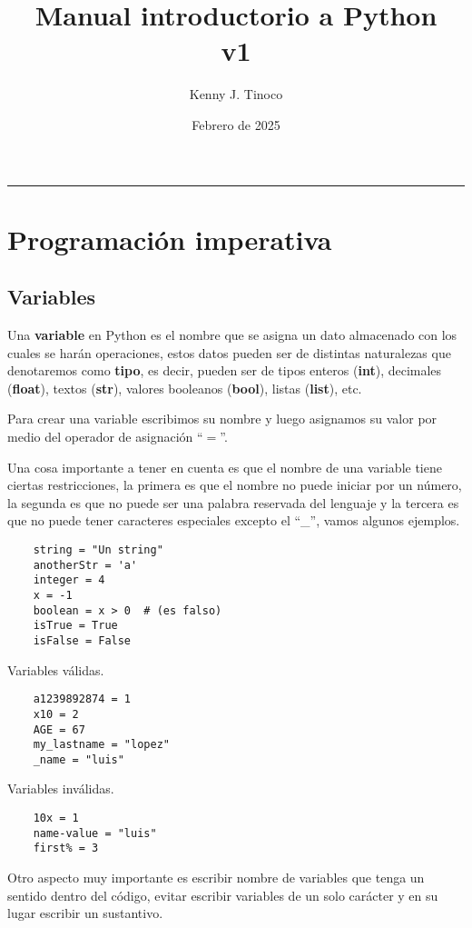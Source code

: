 \documentclass[12pt]{article}
\title{Manual introductorio a Python\\v1}
\author{Kenny J. Tinoco}
\date{Febrero de 2025}
\begin{document}
    \maketitle

    \tableofcontents

    \vspace{5mm}
    \hrule

    \section{Programación imperativa}

    \subsection{Variables}
    Una \textbf{variable} en Python es el nombre que se asigna un dato almacenado con los cuales se harán operaciones,
    estos datos pueden ser de distintas naturalezas que denotaremos como \textbf{tipo}, es decir, pueden ser de tipos
    enteros (\textbf{int}), decimales (\textbf{float}), textos (\textbf{str}), valores booleanos (\textbf{bool}), listas (\textbf{list}), etc.

    Para crear una variable escribimos su nombre y luego asignamos su valor por medio del operador de asignación ``$=$''.

    Una cosa importante a tener en cuenta es que el nombre de una variable tiene ciertas restricciones, la primera es
    que el nombre no puede iniciar por un número, la segunda es que no puede ser una palabra reservada del lenguaje y
    la tercera es que no puede tener caracteres especiales excepto el ``\_'', vamos algunos ejemplos.
    \begin{lstlisting}
    string = "Un string"
    anotherStr = 'a'
    integer = 4
    x = -1
    boolean = x > 0  # (es falso)
    isTrue = True
    isFalse = False
    \end{lstlisting}

    Variables válidas.
    \begin{lstlisting}
    a1239892874 = 1
    x10 = 2
    AGE = 67
    my_lastname = "lopez"
    _name = "luis"
    \end{lstlisting}

    Variables inválidas.
    \begin{lstlisting}
    10x = 1
    name-value = "luis"
    first% = 3
    \end{lstlisting}

    Otro aspecto muy importante es escribir nombre de variables que tenga un sentido dentro del código, evitar escribir
    variables de un solo carácter y en su lugar escribir un sustantivo.
\end{document}

